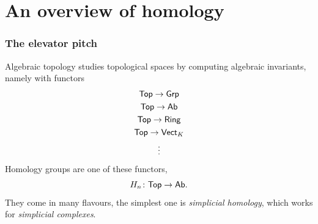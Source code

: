 \documentclass[xcolor=dvipsnames]{beamer}
\begin{document}
\section{An overview of homology}
\begin{frame}
	\frametitle{The elevator pitch}
	Algebraic topology studies topological spaces by computing algebraic invariants, namely
	with functors
	\begin{gather*}
		\mathsf{Top} \to \mathsf{Grp} \\ 
		\mathsf{Top} \to \mathsf{Ab} \\
		\mathsf{Top} \to \mathsf{Ring} \\
		\mathsf{Top} \to \mathsf{Vect}_K \\
				 \vdots
	\end{gather*}
	\pause
	Homology groups are one of these functors,
	\begin{equation*}
		H_n \colon \mathsf{Top} \to \mathsf{Ab}. 
	\end{equation*}
	\pause
	They come in many flavours, the simplest one is \emph{simplicial homology}, which works
	for \emph{simplicial complexes}. 
\end{frame}
\end{document}

